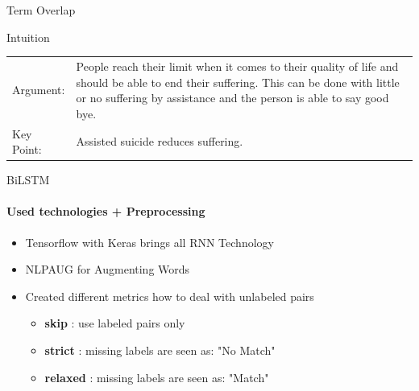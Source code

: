 \documentclass[english,handout]{mlutalk}
\begin{document}
\begin{frame}[allowframebreaks]{Term Overlap}
\begin{block}{Intuition}
    \begin{example}
      \smaller
      \begin{tabular}{lp{}}
        Argument: & People reach their limit when it comes to their quality of life and should be able to end their {\color{blue} suffering}. This can be done with little or no {\color{blue} suffering} by {\color{orange} assistance} and the person is able to say good bye. \\
        Key Point: & {\color{orange} Assisted} suicide reduces {\color{blue} suffering}.
      \end{tabular}
    \end{example}
  \end{block}

\end{frame}

\begin{frame}{BiLSTM}
  \framesubtitle{Used technologies + Preprocessing}

  \begin{itemize}
    \item Tensorflow with Keras brings all RNN Technology
    \item NLPAUG for Augmenting Words
    
    \item Created different metrics how to deal with unlabeled pairs
      \begin{itemize}
        \item \textbf{skip} : use labeled pairs only
        \item \textbf{strict} : missing labels are seen as: "No Match"
        \item \textbf{relaxed} : missing labels are seen as: "Match"
      \end{itemize}
  \end{itemize}

  

\end{frame}


  
  
\end{document}
